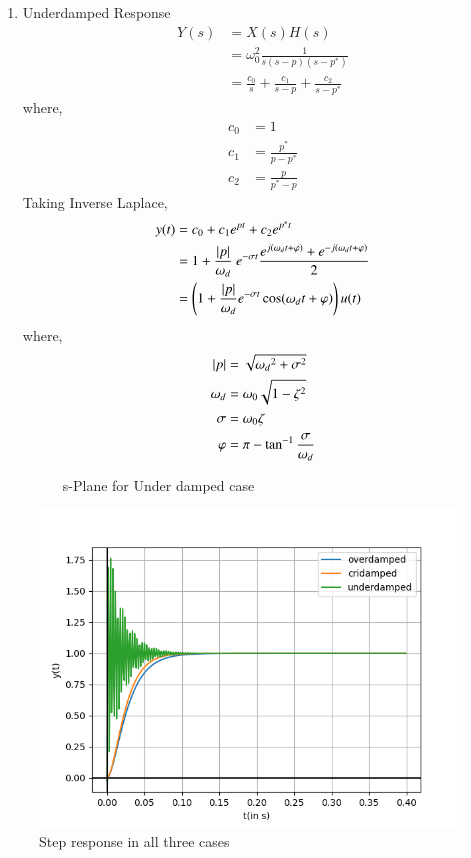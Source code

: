 \documentclass[journal,12pt,twocolumn]{IEEEtran}
\theoremstyle{remark}
\begin{document}
\begin{enumerate}
\item Underdamped Response
\begin{align}
    Y(s) &= X(s)H(s)\\
    &= \omega_0^2\frac{1}{s(s-p)(s-p^\ast)}\\
    &= \frac{c_0}{s}+\frac{c_1}{s-p}+\frac{c_2}{s-p^\ast}
\end{align}
where,
\begin{align}
    c_0 &= 1\\
    c_1 &= \frac{p^\ast}{p-p^\ast}\\
    c_2 &= \frac{p}{p^\ast-p}
\end{align}
Taking Inverse Laplace,
\begin{align}
    y(t) &= c_0+c_1e^{pt}+c_2e^{p^\ast t}\\
    &= 1+\frac{\left\vert p\right\vert}{\omega_d}\ e^{-\sigma t}\frac{
    e^{j(\omega_d t+\varphi)}+e^{-j(\omega_d t+\varphi)}}{2}\\
    &= \left(1+\frac{|p|}{\omega_d}e^{-\sigma t}\cos(\omega_d t+\varphi)\right)u(t)
\end{align}
where,
\begin{align}
    \left\vert p\right\vert&=\sqrt{{\omega_d}^2+\sigma^2}\\
    \omega_d&=\omega_0\sqrt{1-\zeta^2}\\
    \sigma&=\omega_0\zeta\\
    \varphi&=\pi-\tan^{-1}\frac{\sigma}{\omega_d}
\end{align}
\begin{figure}[!ht]
    \centering
    
    \caption{s-Plane for Under damped case}
\end{figure}
\end{enumerate}
\begin{figure}
    \centering
    \includegraphics[width = \columnwidth]{figs/plot.png}
    \caption{Step response in all three cases}
\end{figure}
\end{document}
